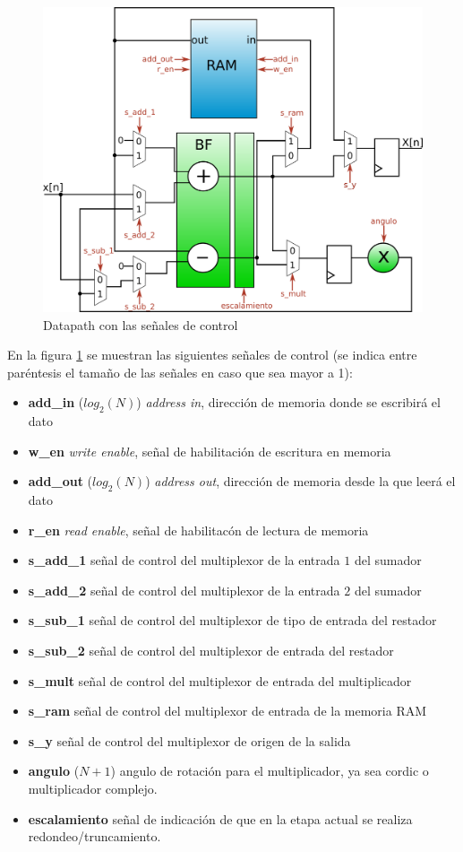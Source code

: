 \begin{figure}[htb!]
        \centering
        \includegraphics[width=12cm]{./figures/datapathMem.png}
        \caption{Datapath con las señales de control}
        \label{fig:datapathmem}
\end{figure}

En la figura \ref{fig:datapathmem} se muestran las siguientes señales de control (se indica entre
paréntesis el tamaño de las señales en caso que sea mayor a 1):

\begin{itemize}
  \item \textbf{add\_in} ($log_2(N)$) \textit{address in}, dirección de memoria donde se escribirá
  el dato
  \item \textbf{w\_en} \textit{write enable}, señal de habilitación de escritura en memoria
  \item \textbf{add\_out} ($log_2(N)$) \textit{address out}, dirección de memoria desde la que leerá
  el dato
  \item \textbf{r\_en} \textit{read enable}, señal de habilitacón de lectura de memoria
  \item \textbf{s\_add\_1} señal de control del multiplexor de la entrada $1$ del sumador
  \item \textbf{s\_add\_2} señal de control del multiplexor de la entrada $2$ del sumador
  \item \textbf{s\_sub\_1} señal de control del multiplexor de tipo de entrada del restador
  \item \textbf{s\_sub\_2} señal de control del multiplexor de entrada del restador
  \item \textbf{s\_mult} señal de control del multiplexor de entrada del multiplicador
  \item \textbf{s\_ram} señal de control del multiplexor de entrada de la memoria RAM
  \item \textbf{s\_y} señal de control del multiplexor de origen de la salida
  \item \textbf{angulo} ($N+1$) angulo de rotación para el multiplicador, ya sea cordic o
  multiplicador complejo.
  \item \textbf{escalamiento} señal de indicación de que en la etapa actual se realiza
  redondeo/truncamiento. 
\end{itemize}

